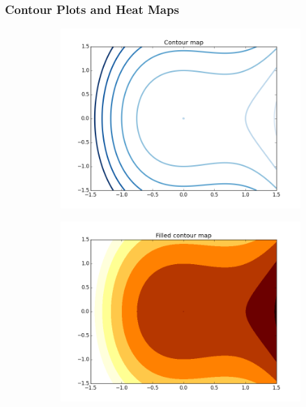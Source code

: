 
\subsubsection*{Contour Plots and Heat Maps} %

\begin{figure}[h]
\centering
\begin{subfigure}{.45\textwidth}
\centering
\includegraphics[width=\textwidth]{contour_map.png}
\end{subfigure}
\begin{subfigure}{.45\textwidth}
\centering
\includegraphics[width=\textwidth]{contour_map_filled.png}

\end{subfigure}
\end{figure}
